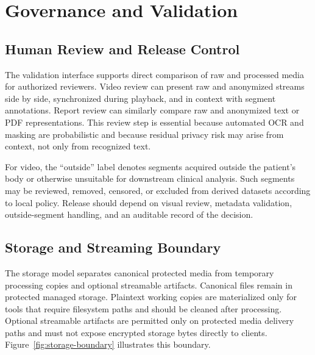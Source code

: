 \documentclass{article}
\begin{document}
\section{Governance and Validation}
\subsection{Human Review and Release Control}
The validation interface supports direct comparison of raw and processed media
for authorized reviewers. Video review can present raw and anonymized streams
side by side, synchronized during playback, and in context with segment
annotations. Report review can similarly compare raw and anonymized text or PDF
representations. This review step is essential because automated OCR and
masking are probabilistic and because residual privacy risk may arise from
context, not only from recognized text.

For video, the ``outside'' label denotes segments acquired outside the
patient's body or otherwise unsuitable for downstream clinical analysis. Such
segments may be reviewed, removed, censored, or excluded from derived datasets
according to local policy. Release should depend on visual review, metadata
validation, outside-segment handling, and an auditable record of the decision.

\subsection{Storage and Streaming Boundary}
The storage model separates canonical protected media from temporary processing
copies and optional streamable artifacts. Canonical files remain in protected
managed storage. Plaintext working copies are materialized only for tools that
require filesystem paths and should be cleaned after processing. Optional
streamable artifacts are permitted only on protected media delivery paths and
must not expose encrypted storage bytes directly to clients.
Figure~\ref{fig:storage-boundary} illustrates this boundary.
\end{document}
